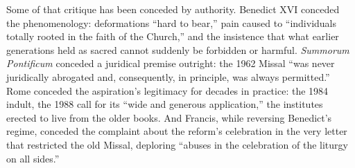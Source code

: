 Some of that critique has been conceded by authority. Benedict XVI conceded the phenomenology: deformations ``hard to bear,'' pain caused to ``individuals totally rooted in the faith of the Church,'' and the insistence that what earlier generations held as sacred cannot suddenly be forbidden or harmful. \emph{Summorum Pontificum} conceded a juridical premise outright: the 1962 Missal ``was never juridically abrogated and, consequently, in principle, was always permitted.'' Rome conceded the aspiration's legitimacy for decades in practice: the 1984 indult, the 1988 call for its ``wide and generous application,'' the institutes erected to live from the older books. And Francis, while reversing Benedict's regime, conceded the complaint about the reform's celebration in the very letter that restricted the old Missal, deploring ``abuses in the celebration of the liturgy on all sides.''

